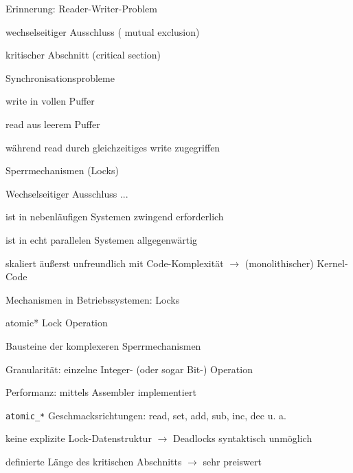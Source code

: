\documentclass[a4paper]{article}
\begin{document}
\begin{multicols}{3}
    Erinnerung: Reader-Writer-Problem
    \begin{itemize*}
        \item wechselseitiger Ausschluss ( mutual exclusion)
        \item kritischer Abschnitt (critical section)
        \item Synchronisationsprobleme
        \begin{itemize*}
            \item write in vollen Puffer
            \item read aus leerem Puffer
            \item während read durch gleichzeitiges write zugegriffen
        \end{itemize*}
    \end{itemize*}

    Sperrmechanismen (Locks)
    \begin{itemize*}
        \item Wechselseitiger Ausschluss ...
        \begin{itemize*}
            \item ist in nebenläufigen Systemen zwingend erforderlich
            \item ist in echt parallelen Systemen allgegenwärtig
            \item skaliert äußerst unfreundlich mit Code-Komplexität $\rightarrow$ (monolithischer) Kernel-Code
        \end{itemize*}
        \item Mechanismen in Betriebssystemen: Locks
    \end{itemize*}

    atomic* Lock Operation
    \begin{itemize*}
        \item Bausteine der komplexeren Sperrmechanismen
        \item Granularität: einzelne Integer- (oder sogar Bit-) Operation
        \item Performanz: mittels Assembler implementiert %
        \item \texttt{atomic\_*} Geschmacksrichtungen: read, set, add, sub, inc, dec u. a.
        \item keine explizite Lock-Datenstruktur $\rightarrow$ Deadlocks syntaktisch unmöglich %
        \item definierte Länge des kritischen Abschnitts $\rightarrow$ sehr preiswert
    \end{itemize*}


\end{multicols}
\end{document}
